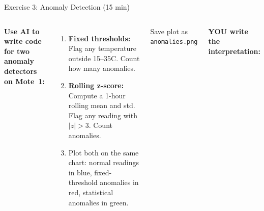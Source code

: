 \documentclass[aspectratio=169,11pt]{beamer}
\begin{document}
\begin{frame}[shrink=5]{Exercise 3: Anomaly Detection (15 min)}
    \begin{columns}
        \textbf{Use AI to write code for two anomaly detectors on Mote~1:}

        \vspace{0.15cm}
        \begin{enumerate}
            \item \textbf{Fixed thresholds:} Flag any temperature outside 15--35\textdegree{}C. Count how many anomalies.

            \item \textbf{Rolling z-score:} Compute a 1-hour rolling mean and std. Flag any reading with $|z| > 3$. Count anomalies.

            \item Plot both on the same chart: normal readings in blue, fixed-threshold anomalies in red, statistical anomalies in green.
        \end{enumerate}

        \vspace{0.1cm}

        \vspace{0.1cm}
        \begin{alertblock}{\small Save plot as \texttt{anomalies.png}}
        \end{alertblock}

        \textbf{YOU write the interpretation:}


\end{columns}
\end{frame}
\end{document}

